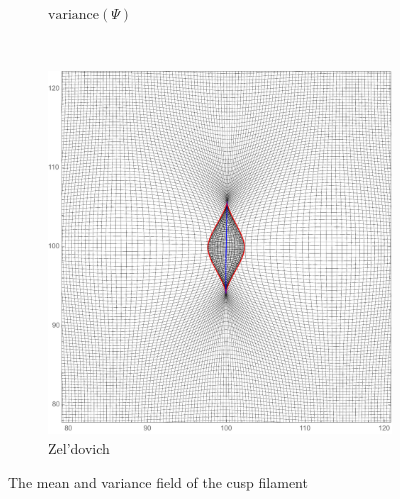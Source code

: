 \documentclass[a4paper, 11pt]{article}
\begin{document}
\begin{figure}
\begin{subfigure}[b]{0.32\textwidth}
\caption{$\text{variance}(\Psi)$}
\end{subfigure}~
\begin{subfigure}[b]{0.32\textwidth}
\includegraphics[width=\textwidth]{Cusp_E_Mean}
\caption{Zel'dovich}
\end{subfigure}
\caption{The mean and variance field of the cusp filament}\label{fig:meanCusp}
\end{figure}
\end{document}
